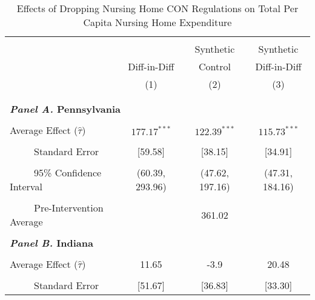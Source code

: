 \documentclass[../Main.tex]{subfiles}
\begin{document}
\newpage
\null
\vfill
\begin{table}[htbp]\centering \footnotesize
\def\sym#1{\ifmmode^{#1}\else\(^{#1}\)\fi}
\captionsetup{width=.78\textwidth}
\caption{\centering Effects of Dropping Nursing Home CON Regulations on Total Per Capita Nursing Home Expenditure}
\label{tab:ave_results_tot_exp_nobord_nocov}
\setlength{\tabcolsep}{10pt}
\begin{tabular}{l*{3}{c}}
\hline\hline
\\[-2ex]
&\multicolumn{1}{c}{}&\multicolumn{1}{c}{Synthetic}&\multicolumn{1}{c}{Synthetic}\\
&\multicolumn{1}{c}{Diff-in-Diff}&\multicolumn{1}{c}{Control}&\multicolumn{1}{c}{Diff-in-Diff}\\
&\multicolumn{1}{c}{(1)}&\multicolumn{1}{c}{(2)}&\multicolumn{1}{c}{(3)}\\
\\[-2ex]
\hline
\\[-.1ex]
\multicolumn{4}{l}{\textbf{\textit{Panel A.} Pennsylvania}}\\
\\[-1.5ex]
\multicolumn{1}{l}{Average Effect ($\hat{\tau}$)}&   \multicolumn{1}{c}{$177.17^{***}$}&   \multicolumn{1}{c}{$122.39^{***}$}&  \multicolumn{1}{c}{$115.73^{***}$}\\
\\[-2ex]
\multicolumn{1}{l}{\ \ \ \ \ Standard Error}  &\multicolumn{1}{c}{[59.58]}&\multicolumn{1}{c}{[38.15]}&\multicolumn{1}{c}{[34.91]}\\
\\[-2ex]
\multicolumn{1}{l}{\ \ \ \ \ 95\% Confidence Interval}&   \multicolumn{1}{c}{(60.39, 293.96)}&   \multicolumn{1}{c}{(47.62, 197.16)}&   \multicolumn{1}{c}{(47.31, 184.16)}\\
\\[-2ex]
\multicolumn{1}{l}{\ \ \ \ \ Pre-Intervention Average}&   \multicolumn{3}{c}{361.02}\\
\\[-.1ex]
\multicolumn{4}{l}{\textbf{\textit{Panel B.} Indiana}}\\
\\[-1.5ex]
\multicolumn{1}{l}{Average Effect ($\hat{\tau}$)}&   \multicolumn{1}{c}{11.65}&   \multicolumn{1}{c}{-3.9}&  \multicolumn{1}{c}{20.48}\\
\\[-2ex]
\multicolumn{1}{l}{\ \ \ \ \ Standard Error}  &\multicolumn{1}{c}{[51.67]}&\multicolumn{1}{c}{[36.83]}&\multicolumn{1}{c}{[33.30]}\\

\end{tabular}
\end{table}
\end{document}
